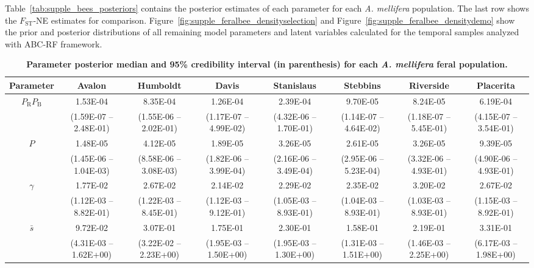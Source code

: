 \documentclass[a4paper, 12pt]{article}
\begin{document}
Table~\ref{tab:supple_bees_posteriors} contains the posterior estimates of each parameter for each \textit{A. mellifera} population. The last row shows the $F_{\mathrm{ST}}$-NE estimates for comparison. Figure~\ref{fig:supple_feralbee_densityselection} and Figure~\ref{fig:supple_feralbee_densitydemo} show the prior and posterior distributions of all remaining model parameters and latent variables calculated for the temporal samples analyzed with ABC-RF framework.\\

 \begin{table}
 \begin{small}
 \caption{\textbf{\small Parameter posterior median and 95\% credibility interval (in parenthesis) for each  \textit{A. mellifera} feral population.}}
 \end{small}
   \begin{tiny}
    \centering
    \begin{tabular}{cccccccc}
    \cmidrule(r){1-8}
        Parameter & Avalon & Humboldt & Davis & Stanislaus & Stebbins & Riverside & Placerita \\
        \midrule
        $P_\mathrm{R}P_\mathrm{B}$  & 1.53E-04 & 8.35E-04 & 1.26E-04 & 2.39E-04 & 9.70E-05 & 8.24E-05 & 6.19E-04 \\
         & (1.59E-07 – 2.48E-01) & (1.55E-06 – 2.02E-01) & (1.17E-07 – 4.99E-02) & (4.32E-06 – 1.70E-01) & (1.14E-07 – 4.64E-02) & (1.18E-07 – 5.45E-01) & (4.15E-07 – 3.54E-01) \\
        $P$ & 1.48E-05 & 4.12E-05 & 1.89E-05 & 3.26E-05 & 2.61E-05 & 3.26E-05 & 9.39E-05 \\
         & (1.45E-06 – 1.04E-03) & (8.58E-06 – 3.08E-03) & (1.82E-06 – 3.99E-04) & (2.16E-06 – 3.49E-04) & (2.95E-06 – 5.23E-04) & (3.32E-06 – 4.93E-01) & (4.90E-06 – 4.93E-01) \\
        $\gamma$ & 1.77E-02 & 2.67E-02 & 2.14E-02 & 2.29E-02 & 2.35E-02 & 3.20E-02 & 2.67E-02 \\
         & (1.12E-03 – 8.82E-01) & (1.22E-03 – 8.45E-01) & (1.12E-03 – 9.12E-01) & (1.05E-03 – 8.93E-01) & (1.04E-03 – 8.93E-01) & (1.03E-03 – 8.93E-01) & (1.15E-03 – 8.92E-01) \\
        $\bar{s}$ & 9.72E-02 & 3.07E-01 & 1.75E-01 & 2.30E-01 & 1.58E-01 & 2.19E-01 & 3.31E-01 \\
         & (4.31E-03 – 1.62E+00) & (3.22E-02 – 2.23E+00) & (1.95E-03 – 1.50E+00) & (1.95E-03 – 1.30E+00) & (1.31E-03 – 1.51E+00) & (1.46E-03 – 2.25E+00) & (6.17E-03 – 1.98E+00) \\

\end{tabular}
\end{tiny}
\end{table}
\end{document}
